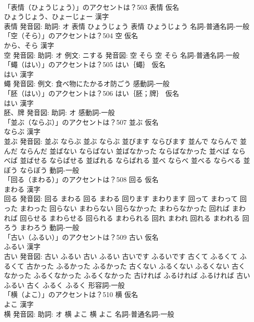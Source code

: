 \documentclass[8pt]{extreport}
\begin{document}
\begin{CJK}{UTF8}{min}
\\	「表情（ひょうじょう）」のアクセントは？503	表情 仮名　
\\	ひょうじょう、ひょーじょー 漢字　
\\	表情 発音図: 助詞: オ	表情 ひょうじょう		表情 ひょうじょう				名詞-普通名詞-一般 
\\	「空（そら）」のアクセントは？504	空 仮名　
\\	から、そら 漢字　
\\	空 発音図: 助詞: オ 例文: ニする 発音図:	空 そら		空 そら				名詞-普通名詞-一般 
\\	「蠅（はい）」のアクセントは？505	はい｛蠅｝ 仮名　
\\	はい 漢字　
\\	蠅 発音図: 例文: 食べ物にたかるオ防ごう							感動詞-一般 
\\	「胚（はい）」のアクセントは？506	はい｛胚；牌｝ 仮名　
\\	はい 漢字　
\\	胚、牌 発音図: 助詞: オ							感動詞-一般 
\\	「並ぶ（ならぶ）」のアクセントは？507	並ぶ 仮名　
\\	ならぶ 漢字　
\\	並ぶ 発音図:	並ぶ ならぶ		並ぶ ならぶ 並びます ならびます 並んで ならんで 並んだ ならんだ 並ばない ならばない 並ばなかった ならばなかった 並べば ならべば 並ばせる ならばせる 並ばれる ならばれる 並べ ならべ 並べる ならべる 並ぼう ならぼう				動詞-一般 
\\	「回る（まわる）」のアクセントは？508	回る 仮名　
\\	まわる 漢字　
\\	回る 発音図:	回る まわる		回る まわる 回ります まわります 回って まわって 回った まわった 回らない まわらない 回らなかった まわらなかった 回れば まわれば 回らせる まわらせる 回られる まわられる 回れ まわれ 回れる まわれる 回ろう まわろう				動詞-一般 
\\	「古い（ふるい）」のアクセントは？509	古い 仮名　
\\	ふるい 漢字　
\\	古い 発音図:	古い ふるい		古い ふるい 古いです ふるいです 古くて ふるくて ふるくて 古かった ふるかった ふるかった 古くない ふるくない ふるくない 古くなかった ふるくなかった ふるくなかった 古ければ ふるければ ふるければ 古い ふるい 古く ふるく ふるく				形容詞-一般 
\\	「横（よこ）」のアクセントは？510	横 仮名　
\\	よこ 漢字　
\\	横 発音図: 助詞: オ	横 よこ		横 よこ				名詞-普通名詞-一般 

\end{CJK}
\end{document}
